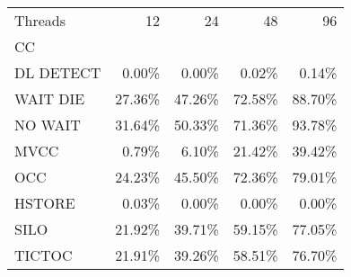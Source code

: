 \begin{tabular}{lrrrr}
\toprule
Threads &     12 &     24 &     48 &     96 \\
CC        &        &        &        &        \\
\midrule
DL DETECT &  0.00\% &  0.00\% &  0.02\% &  0.14\% \\
WAIT DIE  & 27.36\% & 47.26\% & 72.58\% & 88.70\% \\
NO WAIT   & 31.64\% & 50.33\% & 71.36\% & 93.78\% \\
MVCC      &  0.79\% &  6.10\% & 21.42\% & 39.42\% \\
OCC       & 24.23\% & 45.50\% & 72.36\% & 79.01\% \\
HSTORE    &  0.03\% &  0.00\% &  0.00\% &  0.00\% \\
SILO      & 21.92\% & 39.71\% & 59.15\% & 77.05\% \\
TICTOC    & 21.91\% & 39.26\% & 58.51\% & 76.70\% \\
\bottomrule
\end{tabular}
